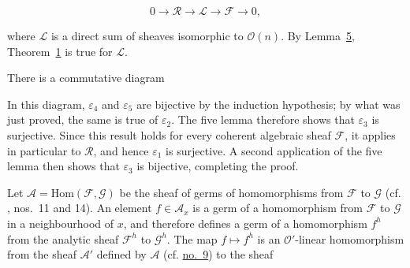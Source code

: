 \begin{equation*}
0\longrightarrow\mathcal{R}\longrightarrow\mathcal{L}
\longrightarrow\mathcal{F}\longrightarrow0,
\end{equation*}

where $\mathcal{L}$ is a direct sum of sheaves isomorphic to $\mathcal{O}(n)$. By Lemma~\hyperref[gaga:lemma:5]{5}, Theorem~\hyperref[gaga:thm:1]{1} is true for $\mathcal{L}$.

There is a commutative diagram

\begin{center}
\scriptsize
{}
\end{center}

In this diagram, $\varepsilon_4$ and $\varepsilon_5$ are bijective by the induction hypothesis; by what was just proved, the same is true of $\varepsilon_2$. The five lemma therefore shows that $\varepsilon_3$ is surjective. Since this result holds for every coherent algebraic sheaf $\mathcal{F}$, it applies in particular to $\mathcal{R}$, and hence $\varepsilon_1$ is surjective. A second application of the five lemma then shows that $\varepsilon_3$ is bijective, completing the proof.


Let $\mathcal{A}=\mathrm{Hom}(\mathcal{F},\mathcal{G})$ be the sheaf of germs of homomorphisms from $\mathcal{F}$ to $\mathcal{G}$ (cf. , nos.~11 and 14). An element $f\in\mathcal{A}_x$ is a germ of a homomorphism from $\mathcal{F}$ to $\mathcal{G}$ in a neighbourhood of $x$, and therefore defines a germ of a homomorphism $f^h$ from the analytic sheaf $\mathcal{F}^h$ to $\mathcal{G}^h$. The map $f\mapsto f^h$ is an $\mathcal{O}'$-linear homomorphism from the sheaf $\mathcal{A}'$ defined by $\mathcal{A}$ (cf. \hyperref[gaga:no:9]{no.~9}) to the sheaf


